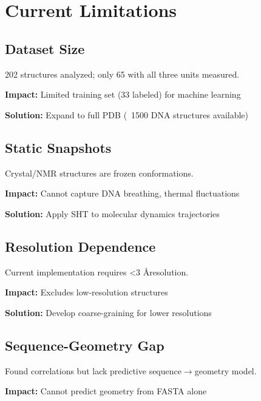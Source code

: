 

\section{Current Limitations}

\subsection{Dataset Size}

202 structures analyzed; only 65 with all three units measured.

\textbf{Impact:} Limited training set (33 labeled) for machine learning

\textbf{Solution:} Expand to full PDB (~1500 DNA structures available)

\subsection{Static Snapshots}

Crystal/NMR structures are frozen conformations.

\textbf{Impact:} Cannot capture DNA breathing, thermal fluctuations

\textbf{Solution:} Apply SHT to molecular dynamics trajectories

\subsection{Resolution Dependence}

Current implementation requires <3 \AA resolution.

\textbf{Impact:} Excludes low-resolution structures

\textbf{Solution:} Develop coarse-graining for lower resolutions

\subsection{Sequence-Geometry Gap}

Found correlations but lack predictive sequence$\rightarrow$geometry model.

\textbf{Impact:} Cannot predict geometry from FASTA alone

